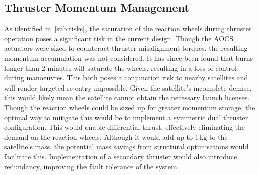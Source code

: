 \documentclass[a4paper, 11pt, conference]{IEEEtran}
\begin{document}
\subsection{Thruster Momentum Management}
\label{sub:ThrusterMomentum}
As identified in~\autoref{sub:risks}, the saturation of the reaction wheels during thruster operation poses a significant risk in the current design. Though the AOCS actuators were sized to counteract thruster misalignment torques, the resulting momentum accumulation was not considered. It has since been found that burns longer than 2 minutes will saturate the wheels, resulting in a loss of control during manoeuvres. This both poses a conjunction risk to nearby satellites and will render targeted re-entry impossible. Given the satellite's incomplete demise, this would likely mean the satellite cannot obtain the necessary launch licenses. Though the reaction wheels could be sized up for greater momentum storage, the optimal way to mitigate this would be to implement a symmetric dual thruster configuration. This would enable differential thrust, effectively eliminating the demand on the reaction wheels. Although it would add up to $1\,\mathrm{kg}$ to the satellite's mass, the potential mass savings from structural optimisations would facilitate this. Implementation of a secondary thruster would also introduce redundancy, improving the fault tolerance of the system.
\end{document}
